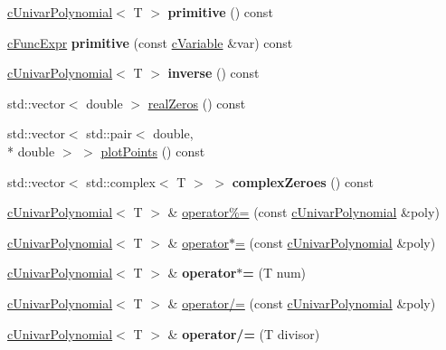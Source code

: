 \begin{DoxyCompactItemize}
\item 
\hypertarget{classcUnivarPolynomial_a9eabafc8d312e0fab838de2b488c3c0f}{\hyperlink{classcUnivarPolynomial}{c\-Univar\-Polynomial}$<$ T $>$ {\bfseries primitive} () const }\label{classcUnivarPolynomial_a9eabafc8d312e0fab838de2b488c3c0f}

\item 
\hypertarget{classcUnivarPolynomial_ac7eeeb7b172bcab70da6e48441298fa4}{\hyperlink{classcFuncExpr}{c\-Func\-Expr} {\bfseries primitive} (const \hyperlink{classcVariable}{c\-Variable} \&var) const }\label{classcUnivarPolynomial_ac7eeeb7b172bcab70da6e48441298fa4}

\item 
\hypertarget{classcUnivarPolynomial_adc403a66d40a9f5689089ac401a71484}{\hyperlink{classcUnivarPolynomial}{c\-Univar\-Polynomial}$<$ T $>$ {\bfseries inverse} () const }\label{classcUnivarPolynomial_adc403a66d40a9f5689089ac401a71484}

\item 
std\-::vector$<$ double $>$ \hyperlink{classcUnivarPolynomial_a0d81e941a048c6ca649dd11d8a4cda8b}{real\-Zeros} () const 
\item 
std\-::vector$<$ std\-::pair$<$ double, \\*
double $>$ $>$ \hyperlink{classcUnivarPolynomial_ad87ea048d88bc7b77493671732c03fad}{plot\-Points} () const 
\item 
\hypertarget{classcUnivarPolynomial_a43462afe158c1ee0f24633521de68615}{std\-::vector$<$ std\-::complex$<$ T $>$ $>$ {\bfseries complex\-Zeroes} () const }\label{classcUnivarPolynomial_a43462afe158c1ee0f24633521de68615}

\item 
\hyperlink{classcUnivarPolynomial}{c\-Univar\-Polynomial}$<$ T $>$ \& \hyperlink{classcUnivarPolynomial_a3aeaae886ae33ff00e9207847c68deb2}{operator\%=} (const \hyperlink{classcUnivarPolynomial}{c\-Univar\-Polynomial} \&poly)
\item 
\hyperlink{classcUnivarPolynomial}{c\-Univar\-Polynomial}$<$ T $>$ \& \hyperlink{classcUnivarPolynomial_a4158585d1768e886c6802030f6ec128f}{operator$\ast$=} (const \hyperlink{classcUnivarPolynomial}{c\-Univar\-Polynomial} \&poly)
\item 
\hypertarget{classcUnivarPolynomial_a835d683a23b47a5bd9c1958f1f8bf814}{\hyperlink{classcUnivarPolynomial}{c\-Univar\-Polynomial}$<$ T $>$ \& {\bfseries operator$\ast$=} (T num)}\label{classcUnivarPolynomial_a835d683a23b47a5bd9c1958f1f8bf814}

\item 
\hyperlink{classcUnivarPolynomial}{c\-Univar\-Polynomial}$<$ T $>$ \& \hyperlink{classcUnivarPolynomial_a60558f674dbadb2d18e3406f4d45da0e}{operator/=} (const \hyperlink{classcUnivarPolynomial}{c\-Univar\-Polynomial} \&poly)
\item 
\hypertarget{classcUnivarPolynomial_ab638a1b793b4f96315899672e77af6e5}{\hyperlink{classcUnivarPolynomial}{c\-Univar\-Polynomial}$<$ T $>$ \& {\bfseries operator/=} (T divisor)}\label{classcUnivarPolynomial_ab638a1b793b4f96315899672e77af6e5}


\end{DoxyCompactItemize}

